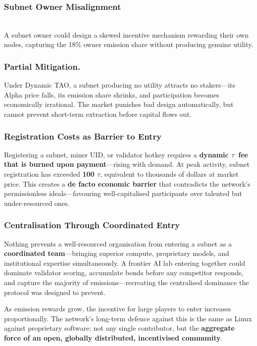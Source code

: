 \documentclass[12pt, a4paper, oneside]{report}
\newcommand{\TAO}{$\tau$}            %
\theoremstyle{definition}
\begin{document}
\subsubsection*{Subnet Owner Misalignment}\\

A subnet owner could design a skewed incentive mechanism rewarding their own nodes, 
capturing the 18\% owner emission share without producing genuine utility.

\subsubsection*{Partial Mitigation.} Under Dynamic TAO, a subnet producing no utility attracts 
no stakers—its Alpha price falls, its emission share shrinks, and participation becomes 
economically irrational. The market punishes bad design automatically, but cannot 
prevent short-term extraction before capital flows out.

\subsubsection*{Registration Costs as Barrier to Entry}

Registering a subnet, miner UID, or validator hotkey requires a 
\textbf{dynamic \TAO\ fee that is burned upon payment}—rising with demand. 
At peak activity, subnet registration has exceeded \textbf{100 \TAO}, 
equivalent to thousands of dollars at market price. This creates a 
\textbf{de facto economic barrier} that contradicts the network's 
permissionless ideals—favouring well-capitalised participants over 
talented but under-resourced ones.



\subsubsection*{Centralisation Through Coordinated Entry}

Nothing prevents a well-resourced organisation from entering a subnet as a 
\textbf{coordinated team}—bringing superior compute, proprietary models, and 
institutional expertise simultaneously. A frontier AI lab entering together 
could dominate validator scoring, accumulate bonds before any competitor 
responds, and capture the majority of emissions—recreating the centralised 
dominance the protocol was designed to prevent.

As emission rewards grow, the incentive for large players to enter increases 
proportionally. The network's long-term defence against this is the same as 
Linux against proprietary software: not any single contributor, but the 
\textbf{aggregate force of an open, globally distributed, incentivised community}.
\end{document}
